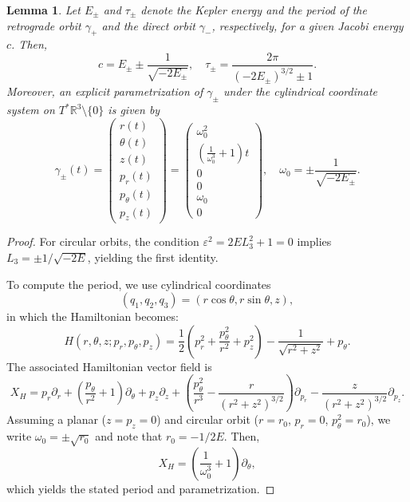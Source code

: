 \documentclass{amsart}
\newcommand{\R}{\mathbb{R}}
\newtheorem{lmm}[thm]{Lemma}
\begin{document}
\begin{lmm}\label{Lemma - Periods of Retrograde and Direct}
	Let $E_\pm$ and $\tau_\pm$ denote the Kepler energy and the period of the retrograde orbit $\gamma_+$ and the direct orbit $\gamma_-$, respectively, for a given Jacobi energy $c$. Then,
	$$
	c = E_\pm \pm \frac{1}{\sqrt{-2E_\pm}},\quad \tau_\pm = \frac{2\pi}{(-2E_\pm)^{3/2} \pm 1}.
	$$
	Moreover, an explicit parametrization of $\gamma_\pm$ under the cylindrical coordinate system on $T^*\R^3\setminus\{0\}$ is given by
	$$
	\gamma_\pm(t) = \begin{pmatrix}
		r(t)\\
		\theta(t)\\
		z(t)\\
		p_r(t)\\
		p_\theta(t)\\
		p_z(t)
	\end{pmatrix} = \begin{pmatrix}
		\omega_0^2\\
		\left(\frac{1}{\omega_0^3} + 1\right)t\\
		0\\
		0\\
		\omega_0\\
		0
	\end{pmatrix},\quad \omega_0 = \pm \frac{1}{\sqrt{-2E_\pm}}.
	$$
\end{lmm}

\begin{proof}
	For circular orbits, the condition $\varepsilon^2 = 2EL_3^2 + 1 = 0$ implies $L_3 = \pm 1/\sqrt{-2E}$, yielding the first identity.
	
	To compute the period, we use cylindrical coordinates
	$$(q_1, q_2, q_3) = (r\cos\theta, r\sin\theta, z),$$
	in which the Hamiltonian becomes:
	$$
	H(r, \theta, z; p_r, p_\theta, p_z) = \frac{1}{2} \left(p_r^2 + \frac{p_\theta^2}{r^2} + p_z^2\right) - \frac{1}{\sqrt{r^2 + z^2}} + p_\theta.
	$$
	The associated Hamiltonian vector field is
	$$
	X_H = p_r\partial_r + \left(\frac{p_\theta}{r^2} + 1\right)\partial_\theta + p_z\partial_z + \left(\frac{p_\theta^2}{r^3} - \frac{r}{(r^2 + z^2)^{3/2}}\right)\partial_{p_r} - \frac{z}{(r^2 + z^2)^{3/2}}\partial_{p_z}.
	$$
	Assuming a planar ($z = p_z = 0$) and circular orbit ($r = r_0$, $p_r = 0$, $p_\theta^2 = r_0$), we write $\omega_0 = \pm \sqrt{r_0}$ and note that $r_0 = -1/2E$. Then,
	$$
	X_H = \left(\frac{1}{\omega_0^3} + 1\right)\partial_\theta,
	$$
	which yields the stated period and parametrization.
\end{proof}
\end{document}
